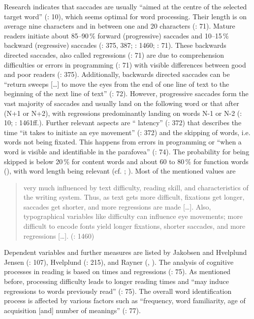 Research indicates that saccades are usually “aimed at the centre of the selected target word” (\citealt{radach-kennedy2004}: 10), which seems optimal for word processing. Their length is on average nine characters and in between one and 20 characters (\citealt{Keating2014}: 71). Mature readers initiate about 85--90\,\% forward (progressive) saccades and 10--15\,\% backward (regressive) saccades (\citealt{rayner1998}: 375, 387; \citealt{rayner2009}: 1460; \citealt{Keating2014}: 71). These backwards directed saccades, also called regressions (\citealt{Keating2014}: 71) are due to comprehension difficulties or errors in  programming (\citealt{Keating2014}: 71) with visible differences between good and poor readers (\citealt{rayner1998}: 375). Additionally, backwards directed saccades can be “return sweeps […] to move the eyes from the end of one line of text to the beginning of the next line of text” (\citealt{Keating2014}: 72). However, progressive saccades form the vast majority of saccades and usually land on the following word or that after (N+1 or N+2), with regressions predominantly landing on words N-1 or N-2 (\citealt{radach-kennedy2004}: 10; \citealt{rayner2009}: 1461ff.). Further relevant aspects are “ latency” (\citealt{rayner1998}: 372) that describes the time “it takes to initiate an eye movement” (\citeyear{rayner1998}: 372) and the skipping of words, i.e. words not being fixated. This happens from errors in  programming or “when a word is visible and identifiable in the parafovea” (\citealt{Keating2014}: 74). The probability for being skipped is below 20\,\% for content words and about 60 to 80\,\% for function words (\citealt{Carpenter1983}), with word length being relevant (cf. \citealt{rayner1976}; \citealt{Keating2014}). Most of the mentioned values are
\begin{quote}
very much influenced by text difficulty, reading skill, and characteristics of the writing system. Thus, as text gets more difficult, fixations get longer, saccades get shorter, and more regressions are made […]. Also, typographical variables like  difficulty can influence eye movements; more difficult to encode fonts yield longer fixations, shorter saccades, and more regressions […]. (\citealt{rayner2009}: 1460)
\end{quote}
Dependent variables and further measures are listed by Jakobsen and Hvelplund Jensen (\citeyear{Jakobsen2008}: 107), Hvelplund (\citeyear{Hvelplund2014}: 215), and Rayner (\citeyear{rayner1998}, \citeyear{rayner2009}). The analysis of cognitive processes in reading is based on  times and regressions (\citealt{Keating2014}: 75). As mentioned before, processing difficulty leads to longer reading times and “may induce regressions to words previously read” (\citealt{Keating2014}: 75). The overall word identification process is affected by various factors such as “frequency, word familiarity, age of acquisition [and] number of meanings” (\citealt{Keating2014}: 77).

